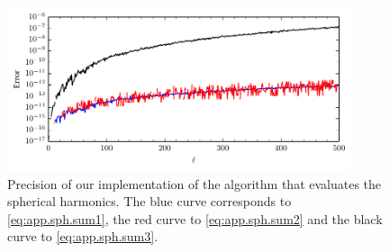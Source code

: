 \begin{figure}
 \centering
 \includegraphics[width=0.9\textwidth]{figs/backmatter/SphPrecision.pdf}
 \caption[Precision of our implementation of the algorithm that evaluates the spherical harmonics]
	  {Precision of our implementation of the algorithm that evaluates the spherical harmonics. 
	  The {\color{blue} blue} curve corresponds to \eqref{eq:app.sph.sum1}, the 
	  {\color{red} red} curve to \eqref{eq:app.sph.sum2} and the black curve to 
	  \eqref{eq:app.sph.sum3}.}
 \label{fig:app.sph.precision}
\end{figure}

\nocite{*}